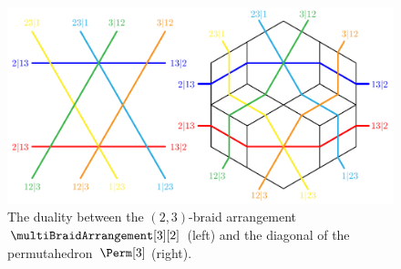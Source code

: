 \documentclass{amsart}
\theoremstyle{definition}
\begin{document}
\begin{figure}
	\includegraphics[scale=.9]{diagonalPermutahedron1}
	\caption{The duality between the $(2,3)$-braid arrangement~$\multiBraidArrangement[3][2]$ (left) and the diagonal of the permutahedron~$\Perm[3]$ (right).}
	\label{fig:diagonalPermutahedron1}
\end{figure}
\end{document}
